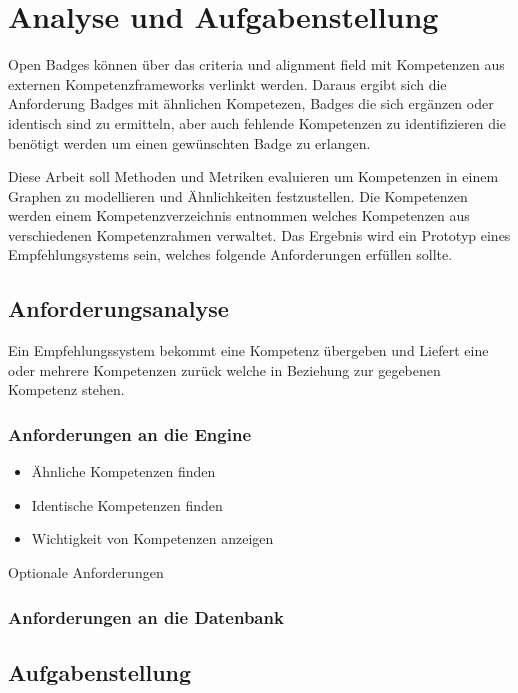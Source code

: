 \section{Analyse und Aufgabenstellung}\label{analysis}

Open Badges können über das criteria und alignment field mit Kompetenzen aus externen Kompetenzframeworks verlinkt werden. Daraus ergibt sich die Anforderung Badges mit ähnlichen Kompetezen, Badges die sich ergänzen oder identisch sind zu ermitteln, aber auch fehlende Kompetenzen zu identifizieren die benötigt werden um einen gewünschten Badge zu erlangen. \cite{OBNO3-A2}

\vspace{1em}

Diese Arbeit soll Methoden und Metriken evaluieren um Kompetenzen in einem Graphen zu modellieren und Ähnlichkeiten festzustellen.  Die Kompetenzen werden einem Kompetenzverzeichnis entnommen welches Kompetenzen aus verschiedenen Kompetenzrahmen verwaltet. Das Ergebnis wird ein Prototyp eines Empfehlungsystems sein, welches folgende Anforderungen erfüllen sollte.

\subsection{Anforderungsanalyse} 

Ein Empfehlungssystem bekommt eine Kompetenz übergeben und Liefert eine oder mehrere Kompetenzen zurück welche in Beziehung zur gegebenen Kompetenz stehen.

\subsubsection{Anforderungen an die Engine}

\begin{itemize}
	\item Ähnliche Kompetenzen finden
	\item Identische Kompetenzen finden
	\item Wichtigkeit von Kompetenzen anzeigen
\end{itemize}

Optionale Anforderungen


\subsubsection{Anforderungen an die Datenbank}

\subsection{Aufgabenstellung}

